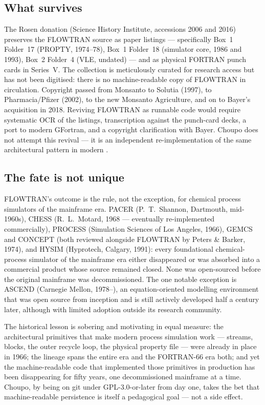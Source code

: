 \documentclass[11pt,a4paper]{article}
\begin{document}
\subsection*{What survives}

The Rosen donation (Science History Institute, accessions 2006 and
2016) preserves the FLOWTRAN source as paper listings --- specifically
Box~1 Folder~17 (PROPTY, 1974--78), Box~1 Folder~18 (simulator core,
1986 and 1993), Box~2 Folder~4 (VLE, undated) --- and as physical
FORTRAN punch cards in Series~V.  The collection is meticulously
curated for research access but has not been digitised: there is no
machine-readable copy of FLOWTRAN in circulation.  Copyright passed
from Monsanto to Solutia (1997), to Pharmacia/Pfizer (2002), to the
new Monsanto Agriculture, and on to Bayer's acquisition in 2018.
Reviving FLOWTRAN as runnable code would require systematic OCR of
the listings, transcription against the punch-card decks, a port to
modern GFortran, and a copyright clarification with Bayer.  Choupo
does not attempt this revival --- it is an independent
re-implementation of the same architectural pattern in modern \cpp{}.

\subsection*{The fate is not unique}

FLOWTRAN's outcome is the rule, not the exception, for chemical
process simulators of the mainframe era.  PACER (P.~T.~Shannon,
Dartmouth, mid-1960s), CHESS (R.~L.~Motard, 1968 --- eventually
re-implemented commercially), PROCESS (Simulation
Sciences of Los Angeles, 1966), GEMCS and CONCEPT (both reviewed
alongside FLOWTRAN by Peters \& Barker, 1974), and HYSIM (Hyprotech,
Calgary, 1991): every foundational
chemical-process simulator of the mainframe era either disappeared
or was absorbed into a commercial product whose source remained
closed.  None was open-sourced before the original mainframe was
decommissioned.  The one notable exception is ASCEND (Carnegie
Mellon, 1978--), an equation-oriented modelling environment that
was open source from inception and is still actively developed
half a century later, although with limited adoption outside its
research community.

The historical lesson is sobering and motivating in equal measure:
the architectural primitives that make modern process simulation
work --- streams, blocks, the outer recycle loop, the physical
property file --- were already in place in 1966; the lineage spans
the entire \cpp{} era and the FORTRAN-66 era both; and yet the
machine-readable code that implemented those primitives in
production has been disappearing for fifty years, one decommissioned
mainframe at a time.  Choupo, by being on git under GPL-3.0-or-later from day
one, takes the bet that machine-readable persistence is itself a
pedagogical goal --- not a side effect.
\end{document}
